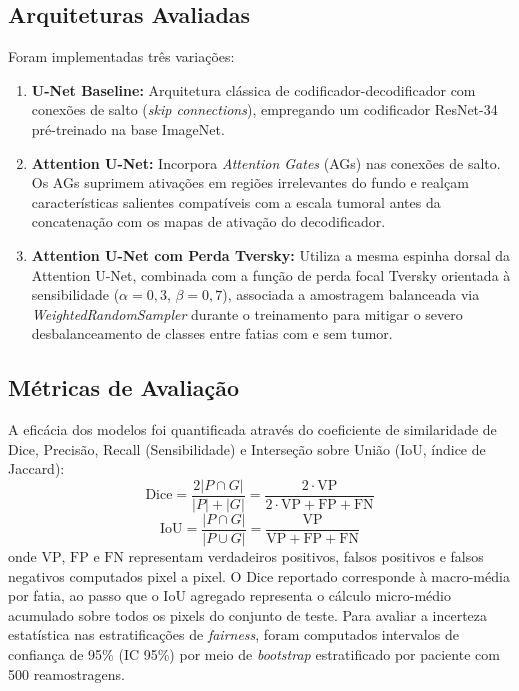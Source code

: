 \documentclass[conference]{IEEEtran}
\begin{document}
\subsection{Arquiteturas Avaliadas}
Foram implementadas três variações:
\begin{enumerate}
    \item \textbf{U-Net Baseline:} Arquitetura clássica de codificador-decodificador com conexões de salto (\textit{skip connections}), empregando um codificador ResNet-34 pré-treinado na base ImageNet.
    \item \textbf{Attention U-Net:} Incorpora \textit{Attention Gates} (AGs) \cite{oktay2018attention} nas conexões de salto. Os AGs suprimem ativações em regiões irrelevantes do fundo e realçam características salientes compatíveis com a escala tumoral antes da concatenação com os mapas de ativação do decodificador.
    \item \textbf{Attention U-Net com Perda Tversky:} Utiliza a mesma espinha dorsal da Attention U-Net, combinada com a função de perda focal Tversky \cite{salehi2017tversky} orientada à sensibilidade ($\alpha=0{,}3$, $\beta=0{,}7$), associada a amostragem balanceada via \textit{WeightedRandomSampler} durante o treinamento para mitigar o severo desbalanceamento de classes entre fatias com e sem tumor.
\end{enumerate}

\subsection{Métricas de Avaliação}
A eficácia dos modelos foi quantificada através do coeficiente de similaridade de Dice, Precisão, Recall (Sensibilidade) e Interseção sobre União (IoU, índice de Jaccard):
\begin{equation}
\text{Dice} = \frac{2 |P \cap G|}{|P| + |G|} = \frac{2 \cdot \text{VP}}{2 \cdot \text{VP} + \text{FP} + \text{FN}}
\end{equation}
\begin{equation}
\text{IoU} = \frac{|P \cap G|}{|P \cup G|} = \frac{\text{VP}}{\text{VP} + \text{FP} + \text{FN}}
\end{equation}
onde $\text{VP}$, $\text{FP}$ e $\text{FN}$ representam verdadeiros positivos, falsos positivos e falsos negativos computados pixel a pixel. O Dice reportado corresponde à macro-média por fatia, ao passo que o IoU agregado representa o cálculo micro-médio acumulado sobre todos os pixels do conjunto de teste. Para avaliar a incerteza estatística nas estratificações de \textit{fairness}, foram computados intervalos de confiança de 95\% (IC 95\%) por meio de \textit{bootstrap} estratificado por paciente com 500 reamostragens.
\end{document}
